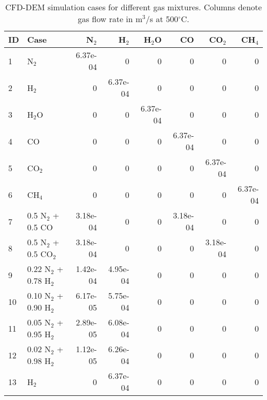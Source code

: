 \begin{table}[H]
    \centering
    \caption{CFD-DEM simulation cases for different gas mixtures. Columns denote gas flow rate in m$^3$/s at 500$^\circ$C.}
    \begin{tabular}{llrrrrrr}
        \toprule
        ID & Case                    & N$_2$     & H$_2$    & H$_2$O   & CO       & CO$_2$    & CH$_4$   \\
        \midrule
        1  & N$_2$                   & 6.37e-04  & 0        & 0        & 0        & 0         & 0        \\
        2  & H$_2$                   & 0         & 6.37e-04 & 0        & 0        & 0         & 0        \\
        3  & H$_2$O                  & 0         & 0        & 6.37e-04 & 0        & 0         & 0        \\
        4  & CO                      & 0         & 0        & 0        & 6.37e-04 & 0         & 0        \\
        5  & CO$_2$                  & 0         & 0        & 0        & 0        & 6.37e-04  & 0        \\
        6  & CH$_4$                  & 0         & 0        & 0        & 0        & 0         & 6.37e-04 \\
        7  & 0.5 N$_2$ + 0.5 CO      & 3.18e-04  & 0        & 0        & 3.18e-04 & 0         & 0        \\
        8  & 0.5 N$_2$ + 0.5 CO$_2$  & 3.18e-04  & 0        & 0        & 0        & 3.18e-04  & 0        \\
        9  & 0.22 N$_2$ + 0.78 H$_2$ & 1.42e-04  & 4.95e-04 & 0        & 0        & 0         & 0        \\
        10 & 0.10 N$_2$ + 0.90 H$_2$ & 6.17e-05  & 5.75e-04 & 0        & 0        & 0         & 0        \\
        11 & 0.05 N$_2$ + 0.95 H$_2$ & 2.89e-05  & 6.08e-04 & 0        & 0        & 0         & 0        \\
        12 & 0.02 N$_2$ + 0.98 H$_2$ & 1.12e-05  & 6.26e-04 & 0        & 0        & 0         & 0        \\
        13 & H$_2$                   & 0         & 6.37e-04 & 0        & 0        & 0         & 0        \\
        \bottomrule
    \end{tabular}
    \label{tab:flowrates}
\end{table}
